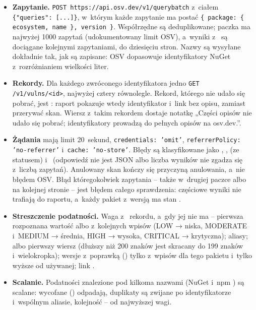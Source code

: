 \begin{itemize}
  \item \textbf{Zapytanie.} \texttt{POST https://api.osv.dev/v1/querybatch} z~ciałem
        \texttt{\{"queries": [...]\}}, w~którym każde zapytanie ma postać
        \texttt{\{ package: \{ ecosystem, name \}, version \}}.
        Współrzędne są deduplikowane; paczka ma najwyżej 1000 zapytań (udokumentowany limit
        OSV), a~wyniki z~ są dociągane kolejnymi zapytaniami, do
        dziesięciu stron. Nazwy są wysyłane dokładnie tak, jak są zapisane: OSV dopasowuje
        identyfikatory NuGet z~rozróżnianiem wielkości liter.
  \item \textbf{Rekordy.} Dla każdego zwróconego identyfikatora jedno \texttt{GET
        /v1/vulns/<id>}, najwyżej cztery równolegle. Rekord, którego nie udało się pobrać, jest
        : raport pokazuje wtedy identyfikator i~link bez opisu, zamiast przerywać
        skan. Wiersz z~takim rekordem dostaje notatkę „Części opisów nie udało się pobrać;
        identyfikatory prowadzą do pełnych opisów na osv.dev.”.
  \item \textbf{Żądania} mają limit 20~sekund, \texttt{credentials: 'omit'},
        \texttt{referrerPolicy: 'no-referrer'} i~\texttt{cache: 'no-store'}. Błędy są
        klasyfikowane jako , ,  (ze statusem)
        i~ (odpowiedź nie jest JSON albo liczba wyników nie zgadza się
        z~liczbą zapytań). Anulowany skan kończy się przyczyną anulowania, a~nie błędem OSV.
        Błąd któregokolwiek zapytania  -- także w~drugiej paczce albo na
        kolejnej stronie -- jest błędem całego sprawdzenia: częściowe wyniki nie trafiają do
        raportu, a~każdy pakiet z~wersją ma stan .
  \item \textbf{Streszczenie podatności.} Waga z~ rekordu,
        a~gdy jej nie ma -- pierwsza rozpoznana wartość  albo
         z~kolejnych wpisów  (LOW →
        niska, MODERATE i~MEDIUM → średnia, HIGH → wysoka, CRITICAL → krytyczna); aliasy;
         albo pierwszy wiersz  (dłuższy niż 200 znaków jest
        skracany do 199 znaków i~wielokropka); wersje z~poprawką () tylko
        z~wpisów  dla tego pakietu i~tylko wyższe od używanej; link
        .
  \item \textbf{Scalanie.} Podatności znalezione pod kilkoma nazwami (NuGet 
        i~npm ) są scalane: wycofane () odpadają,
        duplikaty są zwijane po identyfikatorze i~wspólnym aliasie, kolejność -- od najwyższej
        wagi.
\end{itemize}


